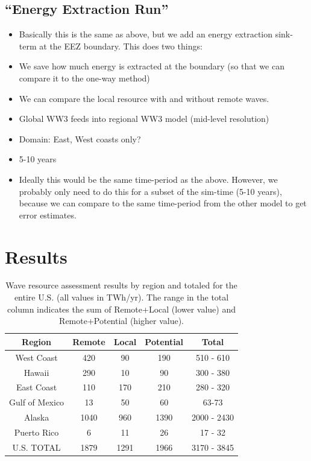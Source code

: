 \documentclass[authoryear,preprint]{elsarticle}
\begin{document}
\subsection{``Energy Extraction Run''}

\begin{itemize}
\item Basically this is the same as above, but we add an energy extraction sink-term at the EEZ boundary. This does two things:
\item We save how much energy is extracted at the boundary (so that we can compare it to the one-way method)
\item We can compare the local resource with and without remote waves.
\item Global WW3 feeds into regional WW3 model (mid-level resolution)
\item Domain: East, West coasts only?
\item 5-10 years
\item Ideally this would be the same time-period as the above. However, we probably only need to do this for a subset of the sim-time (5-10 years), because we can compare to the same time-period from the other model to get error estimates.
\end{itemize}


\section{Results}

\begin{table}[ht]
  \centering
  \begin{tabular}{|c|c|c|c|c|}
    \hline
    Region & Remote & Local & Potential & Total \\
    \hline
    West Coast & 420 & 90 & 190 & 510 - 610 \\
    Hawaii & 290 & 10 & 90 & 300 - 380 \\
    East Coast & 110 & 170 & 210 & 280 - 320 \\
    Gulf of Mexico & 13 & 50 & 60 & 63-73 \\
    Alaska & 1040 & 960 & 1390 & 2000 - 2430 \\
    Puerto Rico & 6 & 11 & 26 & 17 - 32 \\
    \hline \hline
U.S. TOTAL & 1879 & 1291 & 1966 & 3170 - 3845 \\
\hline
  \end{tabular}
  \caption{Wave resource assessment results by region and totaled for the entire U.S. (all values in TWh/yr). The range in the total column indicates the sum of Remote+Local (lower value) and Remote+Potential (higher value).}
  \label{table:totals}
\end{table}
\end{document}
